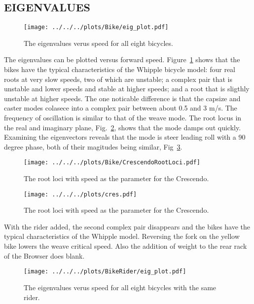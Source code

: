 \documentclass{bmd2010p}
\begin{document}
\subsection{EIGENVALUES}
\begin{figure}[tbp]
    \centering
    \texttt{[image: ../../../plots/Bike/eig\_plot.pdf]}
    \caption{The eigenvalues verus speed for all eight bicycles.}
    \label{fig:bikeEigPlot}
\end{figure}
The eigenvalues can be plotted versus forward speed.
Figure~\ref{fig:bikeEigPlot} shows that the bikes have the typical
characteristics of the Whipple bicycle model: four real roots at very slow
speeds, two of which are unstable; a complex pair that is unstable and lower
speeds and stable at higher speeds; and a root that is sligthly unstable at
higher speeds. The one noticable difference is that the capsize and caster
modes colasece into a complex pair between about 0.5 and 3 m/s. The frequency
of oscillation is similar to that of the weave mode. The root locus in the real
and imaginary plane, Fig.~\ref{fig:rootloci}, shows that the mode damps out
quickly. Examining the eigenvectors reveals that the mode is steer leading
roll with a 90 degree phase, both of their magitudes being similar,
Fig~\ref{fig:evec}.
\begin{figure}[tbp]
    \begin{center}
        \texttt{[image: ../../../plots/Bike/CrescendoRootLoci.pdf]}
    \end{center}
    \caption{The root loci with speed as the parameter for the Crescendo.}
    \label{fig:rootloci}
\end{figure}
\begin{figure}[tbp]
    \begin{center}
        \texttt{[image: ../../../plots/cres.pdf]}
    \end{center}
    \caption{The root loci with speed as the parameter for the Crescendo.}
    \label{fig:evec}
\end{figure}
With the rider added, the second complex pair disappears and the bikes have the
typical characteristics of the Whipple model. Reversing the fork on the yellow
bike lowers the weave critical speed. Also the addition of weight to the rear
rack of the Browser does blank.
\begin{figure}[tbp]
    \centering
    \texttt{[image: ../../../plots/BikeRider/eig\_plot.pdf]}
    \caption{The eigenvalues verus speed for all eight bicycles with the same
    rider.}
    \label{fig:bikeRiderEigPlot}
\end{figure}
\end{document}
